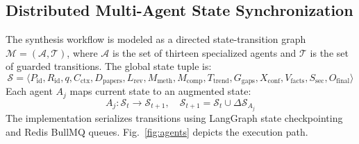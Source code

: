 \documentclass[conference]{IEEEtran}
\begin{document}
\subsection{Distributed Multi-Agent State Synchronization}
The synthesis workflow is modeled as a directed state-transition graph $\mathcal{M} = (\mathcal{A}, \mathcal{T})$, where $\mathcal{A}$ is the set of thirteen specialized agents and $\mathcal{T}$ is the set of guarded transitions. The global state tuple is:
\begin{equation}
\mathcal{S} = \langle P_{\mathrm{id}}, R_{\mathrm{id}}, q, C_{\mathrm{ctx}}, D_{\mathrm{papers}}, L_{\mathrm{rev}}, M_{\mathrm{meth}}, M_{\mathrm{comp}}, T_{\mathrm{trend}}, G_{\mathrm{gaps}}, X_{\mathrm{conf}}, V_{\mathrm{facts}}, S_{\mathrm{sec}}, O_{\mathrm{final}} \rangle
\label{eq:state}
\end{equation}
Each agent $A_j$ maps current state to an augmented state:
\begin{equation}
A_j : \mathcal{S}_t \longrightarrow \mathcal{S}_{t+1}, \quad \mathcal{S}_{t+1} = \mathcal{S}_t \cup \Delta \mathcal{S}_{A_j}
\label{eq:transition}
\end{equation}
The implementation serializes transitions using LangGraph state checkpointing and Redis BullMQ queues. Fig.~\ref{fig:agents} depicts the execution path.
\end{document}
